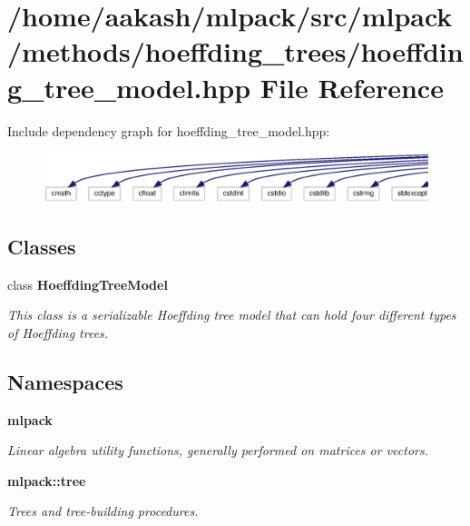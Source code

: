\section{/home/aakash/mlpack/src/mlpack/methods/hoeffding\+\_\+trees/hoeffding\+\_\+tree\+\_\+model.hpp File Reference}
\label{hoeffding__tree__model_8hpp}
Include dependency graph for hoeffding\+\_\+tree\+\_\+model.\+hpp\+:
\nopagebreak
\begin{figure}[H]
\begin{center}
\leavevmode
\includegraphics[width=350pt]{hoeffding__tree__model_8hpp__incl}
\end{center}
\end{figure}
\subsection*{Classes}
\begin{DoxyCompactItemize}
\item 
class \textbf{ Hoeffding\+Tree\+Model}
\begin{DoxyCompactList}\small\item\em This class is a serializable Hoeffding tree model that can hold four different types of Hoeffding trees. \end{DoxyCompactList}\end{DoxyCompactItemize}
\subsection*{Namespaces}
\begin{DoxyCompactItemize}
\item 
 \textbf{ mlpack}
\begin{DoxyCompactList}\small\item\em Linear algebra utility functions, generally performed on matrices or vectors. \end{DoxyCompactList}\item 
 \textbf{ mlpack\+::tree}
\begin{DoxyCompactList}\small\item\em Trees and tree-\/building procedures. \end{DoxyCompactList}\end{DoxyCompactItemize}


